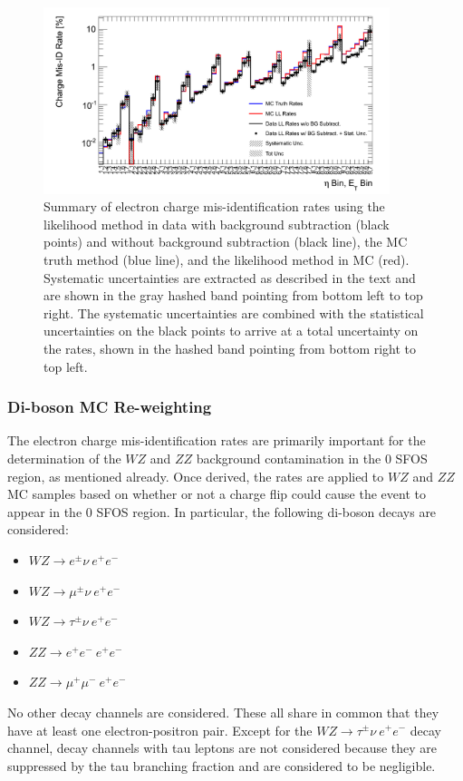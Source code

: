 \begin{figure}[htp]
\centering
\includegraphics[width=0.9\textwidth]{figures/ChargeMisID/Validation_ChargeMisIDRates_PTvsEta_FinalRateWithSys.png}
\caption{Summary of electron charge mis-identification rates using
the likelihood method in data with background subtraction (black points) 
and without background subtraction (black line), the MC truth 
method (blue line), and the likelihood method in MC (red).
Systematic uncertainties are extracted as described in the text and are shown
in the gray hashed band pointing from bottom left to top right. 
The systematic uncertainties are combined with the statistical uncertainties
on the black points to arrive at a total uncertainty on the rates, shown 
in the hashed band pointing from bottom right to top left.}
\label{fig:ChargeMisID_truthRate_finalFig}
\end{figure}




\subsubsection{Di-boson MC Re-weighting}


The electron charge mis-identification  rates are primarily important for the determination of the $WZ$ and $ZZ$ background contamination in the 0 SFOS region,
as mentioned already.
Once derived, the rates are applied to $WZ$ and $ZZ$ MC samples based on 
whether or not a charge flip could cause the event to appear in the 0 SFOS region.  
In particular, the following di-boson decays are considered:
\begin{itemize}
\item $WZ\rightarrow e^{\pm}\nu~ e^{+}e^{-}$
\item $WZ\rightarrow \mu^{\pm}\nu~ e^{+}e^{-}$
\item $WZ\rightarrow \tau^{\pm}\nu~ e^{+}e^{-}$
\item $ZZ\rightarrow e^{+}e^{-}~e^{+}e^{-}$
\item $ZZ\rightarrow \mu^{+}\mu^{-}~ e^{+}e^{-}$
\end{itemize}
No other decay channels are considered.  These all share in common that they 
have at least one electron-positron pair.  
Except for the $WZ\rightarrow \tau^{\pm}\nu~e^{+}e^{-}$ decay channel, 
decay channels with tau leptons are not considered
because they are suppressed by the tau branching fraction and are 
considered to be negligible.

